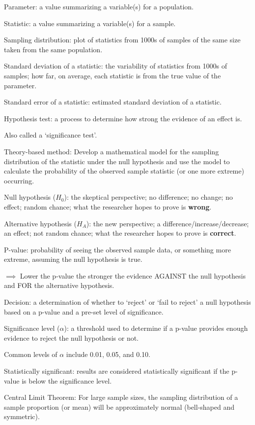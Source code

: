 \documentclass[
]{report}
\newcommand{\rgi}{\hspace{24pt}}  %
\begin{document}
Parameter: a value summarizing a variable(s) for a population.

Statistic: a value summarizing a variable(s) for a sample.

Sampling distribution: plot of statistics from 1000s of samples of the same size taken from the same population.

Standard deviation of a statistic: the variability of statistics from 1000s of samples; how far, on average, each statistic is from the true value of the parameter.

Standard error of a statistic: estimated standard deviation of a statistic.

Hypothesis test: a process to determine how strong the evidence of an effect is.

\rgi Also called a `significance test'.

Theory-based method: Develop a mathematical model for the sampling distribution of the statistic under the null hypothesis and use the model to calculate the probability of the observed sample statistic (or one more extreme) occurring.

Null hypothesis (\(H_0\)): the skeptical perspective; no difference; no change; no effect; random chance; what the researcher hopes to prove is \textbf{wrong}.

Alternative hypothesis (\(H_A\)): the new perspective; a difference/increase/decrease; an effect; not random chance; what the researcher hopes to prove is \textbf{correct}.

P-value: probability of seeing the observed sample data, or something more extreme, assuming the null hypothesis is true.

\(\implies\) Lower the p-value the stronger the evidence AGAINST the null hypothesis and FOR the alternative hypothesis.

Decision: a determination of whether to `reject' or `fail to reject' a null hypothesis based on a p-value and a pre-set level of significance.

Significance level (\(\alpha\)): a threshold used to determine if a p-value provides enough evidence to reject the null hypothesis or not.

\rgi Common levels of \(\alpha\) include 0.01, 0.05, and 0.10.

Statistically significant: results are considered statistically significant if the p-value is below the significance level.

Central Limit Theorem: For large sample sizes, the sampling distribution of a sample proportion (or mean) will be approximately normal (bell-shaped and symmetric).
\end{document}
